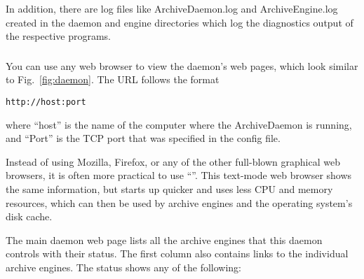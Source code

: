 \noindent In addition, there are log files like ArchiveDaemon.log and
ArchiveEngine.log created in the daemon and engine directories which
log the diagnostics output of the respective programs.

\subsubsection{} \label{sec:daemonserver}
You can use any web browser to view the daemon's web pages,
which look similar to Fig.~\ref{fig:daemon}.
The URL follows the format
\begin{lstlisting}[keywordstyle=\sffamily]
    http://host:port
\end{lstlisting}
\noindent where ``host'' is the name of the computer where the
ArchiveDaemon is running, and ``Port'' is the TCP port that was
specified in the config file.

\NOTE Instead of using Mozilla, Firefox, or any of the other
full-blown graphical web browsers, it is often more practical to use
``''. This text-mode web browser shows the same
information, but starts up quicker and uses less CPU
and memory resources, which can then be used by archive engines and the
operating system's disk cache.

The main daemon web page lists all the archive engines that this
daemon controls with their status. The first column also contains
links to the individual archive engines. The status shows any of the
following:

